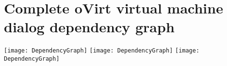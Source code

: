 





\chapter{Complete oVirt virtual machine dialog dependency graph} \label{graph}
\newpage
\texttt{[image: DependencyGraph]}
\newpage
\texttt{[image: DependencyGraph]}
\newpage
\texttt{[image: DependencyGraph]}
